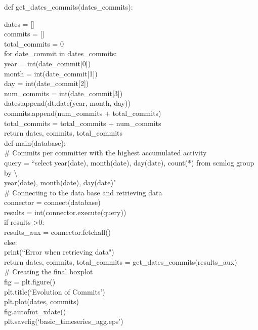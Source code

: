 \documentclass[a4paper, 12pt]{book}
\begin{document}
\noindent def get\_dates\_commits(dates\_commits):\bigskip

dates = []\\
  \indent commits = []\\
  \indent total\_commits = 0\\

  \indent for date\_commit in dates\_commits:\\
  \indent \indent year = int(date\_commit[0])\\
  \indent \indent month = int(date\_commit[1])\\
  \indent \indent day = int(date\_commit[2])\\
  \indent \indent num\_commits = int(date\_commit[3])\\
  \indent \indent dates.append(dt.date(year, month, day))\\
  \indent \indent commits.append(num\_commits + total\_commits)\\
  \indent \indent total\_commits = total\_commits + num\_commits\\

  \indent return dates, commits, total\_commits\\

\noindent def main(database):\\

\# Commits per committer with the highest accumulated activity\\
\indent query = ``select year(date), month(date), day(date), count(*) from scmlog group by \textbackslash\\
\indent year(date), month(date), day(date)"\\


\# Connecting to the data base and retrieving data\\
\indent connector = connect(database)\\
\indent results = int(connector.execute(query))\\
\indent if results \textgreater 0:\\
  \indent \indent results\_aux = connector.fetchall()\\
  \indent else:\\  
  \indent \indent print(``Error when retrieving data")\\

\noindent return dates, commits, total\_commits = get\_dates\_commits(results\_aux)\\

\noindent \# Creating the final boxplot\\
fig = plt.figure()\\
plt.title(`Evolution of Commits')\\
plt.plot(dates, commits)\\
fig.autofmt\_xdate()\\
plt.savefig(`basic\_timeseries\_agg.eps')\\
\end{document}
